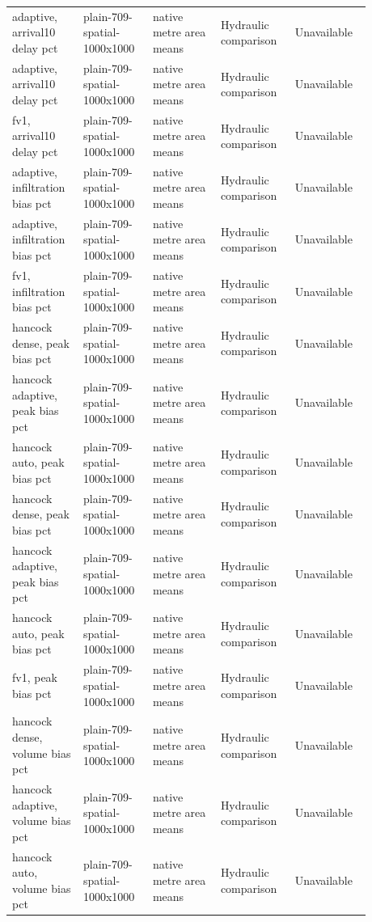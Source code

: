 \begin{longtable}{p{0.1760\linewidth}p{0.1760\linewidth}p{0.1760\linewidth}p{0.1760\linewidth}p{0.1760\linewidth}}
adaptive, arrival10 delay pct & plain-709-spatial-1000x1000 & native metre area means & Hydraulic comparison & Unavailable \\
adaptive, arrival10 delay pct & plain-709-spatial-1000x1000 & native metre area means & Hydraulic comparison & Unavailable \\
fv1, arrival10 delay pct & plain-709-spatial-1000x1000 & native metre area means & Hydraulic comparison & Unavailable \\
adaptive, infiltration bias pct & plain-709-spatial-1000x1000 & native metre area means & Hydraulic comparison & Unavailable \\
adaptive, infiltration bias pct & plain-709-spatial-1000x1000 & native metre area means & Hydraulic comparison & Unavailable \\
fv1, infiltration bias pct & plain-709-spatial-1000x1000 & native metre area means & Hydraulic comparison & Unavailable \\
hancock dense, peak bias pct & plain-709-spatial-1000x1000 & native metre area means & Hydraulic comparison & Unavailable \\
hancock adaptive, peak bias pct & plain-709-spatial-1000x1000 & native metre area means & Hydraulic comparison & Unavailable \\
hancock auto, peak bias pct & plain-709-spatial-1000x1000 & native metre area means & Hydraulic comparison & Unavailable \\
hancock dense, peak bias pct & plain-709-spatial-1000x1000 & native metre area means & Hydraulic comparison & Unavailable \\
hancock adaptive, peak bias pct & plain-709-spatial-1000x1000 & native metre area means & Hydraulic comparison & Unavailable \\
hancock auto, peak bias pct & plain-709-spatial-1000x1000 & native metre area means & Hydraulic comparison & Unavailable \\
fv1, peak bias pct & plain-709-spatial-1000x1000 & native metre area means & Hydraulic comparison & Unavailable \\
hancock dense, volume bias pct & plain-709-spatial-1000x1000 & native metre area means & Hydraulic comparison & Unavailable \\
hancock adaptive, volume bias pct & plain-709-spatial-1000x1000 & native metre area means & Hydraulic comparison & Unavailable \\
hancock auto, volume bias pct & plain-709-spatial-1000x1000 & native metre area means & Hydraulic comparison & Unavailable \\

\end{longtable}
